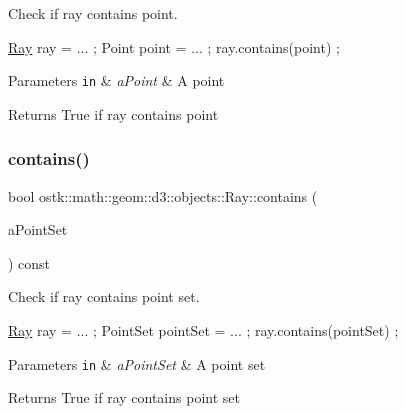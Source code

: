 Check if ray contains point. 


\begin{DoxyCode}
\hyperlink{classostk_1_1math_1_1geom_1_1d3_1_1objects_1_1_ray_a78335698f8a4f72e613e607b13121df0}{Ray} ray = ... ;
Point point = ... ;
ray.contains(point) ;
\end{DoxyCode}



\begin{DoxyParams}[1]{Parameters}
\mbox{\tt in}  & {\em a\+Point} & A point \\
\hline
\end{DoxyParams}
\begin{DoxyReturn}{Returns}
True if ray contains point 
\end{DoxyReturn}
\mbox{\label{classostk_1_1math_1_1geom_1_1d3_1_1objects_1_1_ray_a4433e066d6de57630140527bc74442ec}} 
\subsubsection{\texorpdfstring{contains()}{contains()}\hspace{0.1cm}{\footnotesize\ttfamily [2/2]}}
{\footnotesize\ttfamily bool ostk\+::math\+::geom\+::d3\+::objects\+::\+Ray\+::contains (\begin{DoxyParamCaption}\item[{const \hyperlink{classostk_1_1math_1_1geom_1_1d3_1_1objects_1_1_point_set}{Point\+Set} \&}]{a\+Point\+Set }\end{DoxyParamCaption}) const}



Check if ray contains point set. 


\begin{DoxyCode}
\hyperlink{classostk_1_1math_1_1geom_1_1d3_1_1objects_1_1_ray_a78335698f8a4f72e613e607b13121df0}{Ray} ray = ... ;
PointSet pointSet = ... ;
ray.contains(pointSet) ;
\end{DoxyCode}



\begin{DoxyParams}[1]{Parameters}
\mbox{\tt in}  & {\em a\+Point\+Set} & A point set \\
\hline
\end{DoxyParams}
\begin{DoxyReturn}{Returns}
True if ray contains point set 
\end{DoxyReturn}
\mbox{\label{classostk_1_1math_1_1geom_1_1d3_1_1objects_1_1_ray_a9c7b98506891aac4fa9f3d20939fcf67}} 
